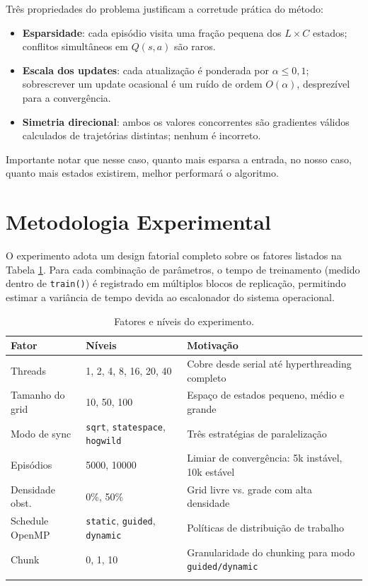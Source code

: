 \documentclass[12pt]{article}
\begin{document}
Três propriedades do problema justificam a corretude prática do método:

\begin{itemize}
\item \textbf{Esparsidade}: cada episódio visita uma fração pequena dos \(L \times C\)
estados; conflitos simultâneos em \(Q(s,a)\) são raros.
\item \textbf{Escala dos updates}: cada atualização é ponderada por \(\alpha \leq 0{,}1\);
sobrescrever um update ocasional é um ruído de ordem \(O(\alpha)\),
desprezível para a convergência.
\item \textbf{Simetria direcional}: ambos os valores concorrentes são gradientes válidos
calculados de trajetórias distintas; nenhum é incorreto.
\end{itemize}

Importante notar que nesse caso, quanto mais esparsa a entrada, no
nosso caso, quanto mais estados existirem, melhor performará o algoritmo.
\section{Metodologia Experimental}
\label{sec:org53b1e5b}

O experimento adota um design fatorial completo sobre os fatores
listados na Tabela \ref{tab:org8f369ab}. Para cada combinação de
parâmetros, o tempo de treinamento (medido dentro de \texttt{train()}) é
registrado em múltiplos blocos de replicação, permitindo estimar a
variância de tempo devida ao escalonador do sistema operacional.

\begin{table}[htbp]
\caption{\label{tab:org8f369ab}Fatores e níveis do experimento.}
\centering
\small
\begin{tabular}{lp{3.5cm}p{6cm}}
\toprule
Fator & Níveis & Motivação\\
\midrule
Threads & 1, 2, 4, 8, 16, 20, 40 & Cobre desde serial até hyperthreading completo\\
Tamanho do grid & 10, 50, 100 & Espaço de estados pequeno, médio e grande\\
Modo de sync & \texttt{sqrt}, \texttt{statespace}, \texttt{hogwild} & Três estratégias de paralelização\\
Episódios & 5000, 10000 & Limiar de convergência: 5k instável, 10k estável\\
Densidade obst. & 0\%, 50\% & Grid livre vs. grade com alta densidade\\
Schedule OpenMP & \texttt{static}, \texttt{guided}, \texttt{dynamic} & Políticas de distribuição de trabalho\\
Chunk & 0, 1, 10 & Granularidade do chunking para modo \texttt{guided/dynamic}\\
 &  & \\
\bottomrule
\end{tabular}
\end{table}
\end{document}
